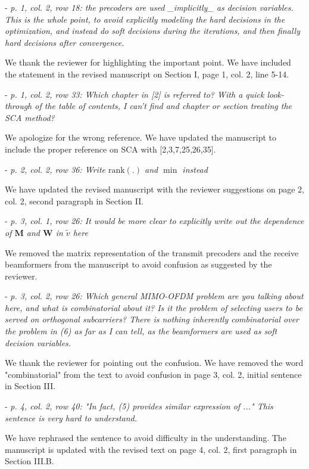 \begin{itemize}
\begin{itemize}
 - \textit{p. 1, col. 2, row 18: the precoders are used \_implicitly\_ as decision variables. This is the whole point, to avoid explicitly modeling the hard decisions in the optimization, and instead do soft decisions during the iterations, and then finally hard decisions after convergence.}

\resp We thank the reviewer for highlighting the important point. We have included the statement in the revised manuscript on Section I, page 1, col. 2, line 5-14.

 - \textit{p. 1, col. 2, row 33: Which chapter in [2] is referred to? With a quick look-through of the table of contents, I can't find and chapter or section treating the SCA method?}

\resp We apologize for the wrong reference. We have updated the manuscript to include the proper reference on SCA with [2,3,7,25,26,35].

 - \textit{p. 2, col. 2, row 36: Write $\text{rank}(.)$ and $\min$ instead}

\resp We have updated the revised manuscript with the reviewer suggestions on page 2, col. 2, second paragraph in Section II.

 - \textit{p. 3, col. 1, row 26: It would be more clear to explicitly write out the dependence of $\mathbf{M}$ and $\mathbf{W}$ in $\tilde{v}$ here}

\resp We removed the matrix representation of the transmit precoders and the receive beamformers from the manuscript to avoid confusion as suggested by the reviewer.

 - \textit{p. 3, col. 2, row 26: Which general MIMO-OFDM problem are you talking about here, and what is combinatorial about it? Is it the problem of selecting users to be served on orthogonal subcarriers? There is nothing inherently combinatorial over the problem in (6) as far as I can tell, as the beamformers are used as soft decision variables.}

\resp We thank the reviewer for pointing out the confusion. We have removed the word "combinatorial" from the text to avoid confusion in page 3, col. 2, initial sentence in Section III.

 - \textit{p. 4, col. 2, row 40: "In fact, (5) provides similar expression of ..." This sentence is very hard to understand.}

\resp We have rephrased the sentence to avoid difficulty in the understanding. The manuscript is updated with the revised text on page 4, col. 2, first paragraph in Section III.B.


\end{itemize}
\end{itemize}
